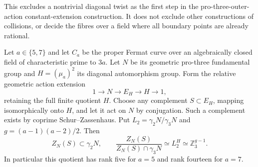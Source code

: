 This excludes a nontrivial diagonal twist as the first step in the
pro-three-outer-action constant-extension construction. It does not
exclude other constructions of collisions, or decide the fibres
over a field where all boundary points are already rational.

\begin{proposition}
\label{prop:ff3-diagonal-centralizer}
Let $a\in\{5,7\}$ and let $C_a$ be the proper Fermat curve over
an algebraically closed field of characteristic prime to $3a$.
Let $N$ be its geometric pro-three fundamental group and
$H=(\mu_a)^2$ its diagonal automorphism group. Form the relative
geometric action extension
\[
 1\longrightarrow N\longrightarrow E_H\longrightarrow H
 \longrightarrow1,
\]
retaining the full finite quotient $H$. Choose any complement
$S\subset E_H$, mapping isomorphically onto $H$, and let it act
on $N$ by conjugation. Such a complement exists by coprime
Schur--Zassenhaus. Put $L_2=\gamma_2N/\gamma_3N$ and
$g=(a-1)(a-2)/2$. Then
\[
 Z_N(S)\subset\gamma_2N,\qquad
 \frac{Z_N(S)}{Z_N(S)\cap\gamma_3N}
       \simeq L_2^H\simeq\mathbb Z_3^{g-1}.
\]
In particular this quotient has rank five for $a=5$ and rank
fourteen for $a=7$.
\end{proposition}

